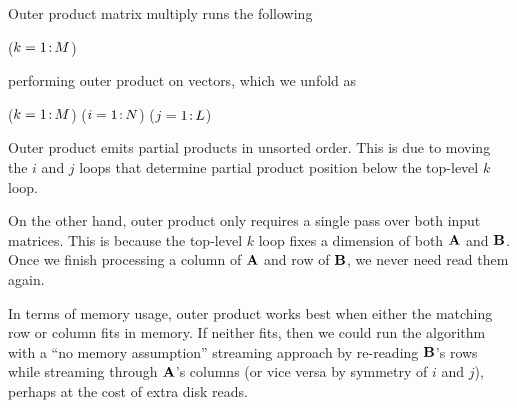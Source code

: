 Outer product matrix multiply runs the following

\removelatexerror
\begin{algorithm}[H]
\vspace{\algspace}
\fore($k = 1\colon\! M$){
}
\vspace{\algspace}
\end{algorithm}

\noindent %
performing outer %
product
on vectors, 
which we unfold as

\removelatexerror
\begin{algorithm}[H]
\vspace{\algspace}
\fore($k = 1\colon\! M$){
\fore($i = 1\colon\! N$){
\fore($j = 1\colon\! L$){
}}}
\vspace{\algspace}
\end{algorithm}

Outer product emits partial products in unsorted order.
This is due to moving the $i$ and $j$ loops
that determine partial product position
below the top-level $k$ loop.

On the other hand, outer product only requires a single pass over both input matrices.
This is because the top-level $k$ loop fixes a dimension of both $\mathbf{A}$ and $\mathbf{B}$.
Once we finish processing a column of $\mathbf{A}$ and row of $\mathbf{B}$,
we never need read them again.%

In terms of memory usage, outer product works best when either the matching row or column fits in memory.
If neither fits, then we could run the algorithm 
with a ``no memory assumption'' streaming approach
by re-reading $\mathbf{B}$'s rows while streaming through $\mathbf{A}$'s columns 
(or vice versa by symmetry of $i$ and $j$),
perhaps at the cost of extra disk reads.

